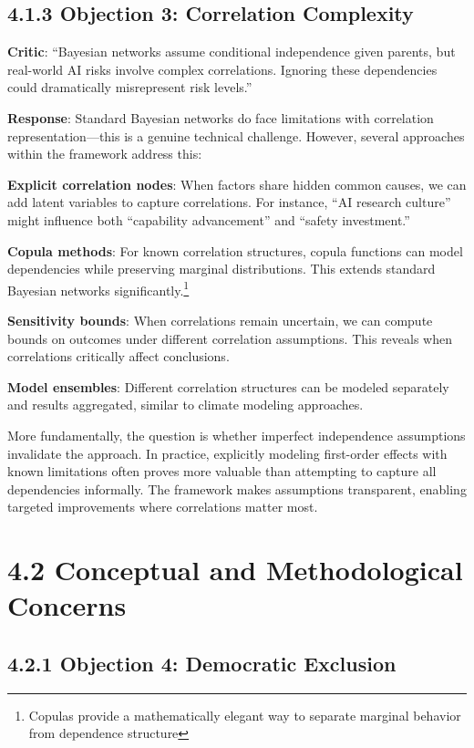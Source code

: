 \documentclass[
  11pt,
  letterpaper,
  openany]{book}
\begin{document}
\subsection{4.1.3 Objection 3: Correlation
Complexity}\label{sec-correlation-complexity}

\textbf{Critic}: ``Bayesian networks assume conditional independence
given parents, but real-world AI risks involve complex correlations.
Ignoring these dependencies could dramatically misrepresent risk
levels.''

\textbf{Response}: Standard Bayesian networks do face limitations with
correlation representation---this is a genuine technical challenge.
However, several approaches within the framework address this:

\textbf{Explicit correlation nodes}: When factors share hidden common
causes, we can add latent variables to capture correlations. For
instance, ``AI research culture'' might influence both ``capability
advancement'' and ``safety investment.''

\textbf{Copula methods}: For known correlation structures, copula
functions can model dependencies while preserving marginal
distributions. This extends standard Bayesian networks
significantly.\footnote{Copulas provide a mathematically elegant way to
  separate marginal behavior from dependence structure}

\textbf{Sensitivity bounds}: When correlations remain uncertain, we can
compute bounds on outcomes under different correlation assumptions. This
reveals when correlations critically affect conclusions.

\textbf{Model ensembles}: Different correlation structures can be
modeled separately and results aggregated, similar to climate modeling
approaches.

More fundamentally, the question is whether imperfect independence
assumptions invalidate the approach. In practice, explicitly modeling
first-order effects with known limitations often proves more valuable
than attempting to capture all dependencies informally. The framework
makes assumptions transparent, enabling targeted improvements where
correlations matter most.

\section{4.2 Conceptual and Methodological
Concerns}\label{sec-conceptual-concerns}

\subsection{4.2.1 Objection 4: Democratic
Exclusion}\label{sec-democratic-exclusion}
\end{document}
